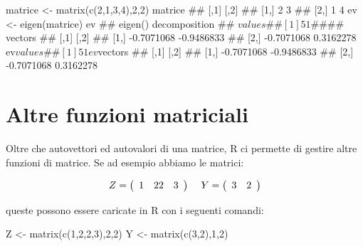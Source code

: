 \documentclass[a4paper,12pt,oneside]{book}
\newenvironment{Shaded}{\begin{snugshade}}{\end{snugshade}}
\newcommand{\DecValTok}[1]{#1}
\newcommand{\SpecialCharTok}[1]{#1}
\newcommand{\DocumentationTok}[1]{#1}
\newcommand{\OtherTok}[1]{#1}
\newcommand{\FunctionTok}[1]{#1}
\newcommand{\NormalTok}[1]{#1}
\begin{document}
\begin{Shaded}
\begin{Highlighting}[]
\NormalTok{matrice  }\OtherTok{\textless{}{-}}  \FunctionTok{matrix}\NormalTok{(}\FunctionTok{c}\NormalTok{(}\DecValTok{2}\NormalTok{,}\DecValTok{1}\NormalTok{,}\DecValTok{3}\NormalTok{,}\DecValTok{4}\NormalTok{),}\DecValTok{2}\NormalTok{,}\DecValTok{2}\NormalTok{)}
\NormalTok{matrice}
\DocumentationTok{\#\#      [,1] [,2]}
\DocumentationTok{\#\# [1,]    2    3}
\DocumentationTok{\#\# [2,]    1    4}
\NormalTok{ev  }\OtherTok{\textless{}{-}}  \FunctionTok{eigen}\NormalTok{(matrice)}
\NormalTok{ev}
\DocumentationTok{\#\# eigen() decomposition}
\DocumentationTok{\#\# $values}
\DocumentationTok{\#\# [1] 5 1}
\DocumentationTok{\#\# }
\DocumentationTok{\#\# $vectors}
\DocumentationTok{\#\#            [,1]       [,2]}
\DocumentationTok{\#\# [1,] {-}0.7071068 {-}0.9486833}
\DocumentationTok{\#\# [2,] {-}0.7071068  0.3162278}
\NormalTok{ev}\SpecialCharTok{$}\NormalTok{values}
\DocumentationTok{\#\# [1] 5 1}
\NormalTok{ev}\SpecialCharTok{$}\NormalTok{vectors}
\DocumentationTok{\#\#            [,1]       [,2]}
\DocumentationTok{\#\# [1,] {-}0.7071068 {-}0.9486833}
\DocumentationTok{\#\# [2,] {-}0.7071068  0.3162278}
\end{Highlighting}
\end{Shaded}

\hypertarget{altre-funzioni-matriciali}{%
\section*{Altre funzioni matriciali}\label{altre-funzioni-matriciali}}

Oltre che autovettori ed autovalori di una matrice, R ci permette di gestire altre funzioni di matrice. Se ad esempio abbiamo
le matrici:

\[
Z = \left( {\begin{array}{*{20}c}
   1 & 2  
   2 & 3  
\end{array}} \right)\,\,\,\,\,\,\,Y = \left( {\begin{array}{*{20}c}
   3 & 2  
\end{array}} \right)
\]

queste possono essere caricate in R con i seguenti comandi:

\begin{Shaded}
\begin{Highlighting}[]
\NormalTok{Z  }\OtherTok{\textless{}{-}}  \FunctionTok{matrix}\NormalTok{(}\FunctionTok{c}\NormalTok{(}\DecValTok{1}\NormalTok{,}\DecValTok{2}\NormalTok{,}\DecValTok{2}\NormalTok{,}\DecValTok{3}\NormalTok{),}\DecValTok{2}\NormalTok{,}\DecValTok{2}\NormalTok{)}
\NormalTok{Y  }\OtherTok{\textless{}{-}}  \FunctionTok{matrix}\NormalTok{(}\FunctionTok{c}\NormalTok{(}\DecValTok{3}\NormalTok{,}\DecValTok{2}\NormalTok{),}\DecValTok{1}\NormalTok{,}\DecValTok{2}\NormalTok{)}
\end{Highlighting}
\end{Shaded}
\end{document}
